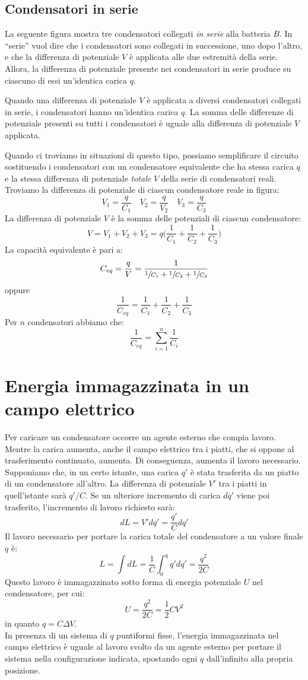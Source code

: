 \documentclass[12pt]{report}
\begin{document}
	\subsection{Condensatori in serie}
	La seguente figura mostra tre condensatori collegati \textit{in serie} alla batteria $B$. In ``serie'' vuol dire che i condensatori sono collegati in successione, uno dopo l'altro, e che la differenza di potenziale $V$ è applicata alle due estremità della serie. Allora, la differenza di potenziale presente nei condensatori in serie produce su ciascuno di essi un'identica carica $q$.
	\begin{center}
		Quando una differenza di potenziale $V$ è applicata a diversi condensatori collegati in serie, i condensatori hanno un'identica carica $q$. La somma delle differenze di potenziale presenti su tutti i condensatori è uguale alla differenza di potenziale $V$ applicata.
	\end{center}
	Quando ci troviamo in situazioni di questo tipo, possiamo semplificare il circuito sostituendo i condensatori con un condensatore equivalente che ha stessa carica $q$ e la stessa differenza di potenziale \textit{totale} $V$ della serie di condensatori reali. \\
	Troviamo la differenza di potenziale di ciascun condensatore reale in figura:
	\[
	V_1 = \frac{q}{C_1} \quad V_2 = \frac{q}{V_2} \quad V_3 = \frac{q}{C_3}
	\]
	La differenza di potenziale $V$ è la somma delle potenziali di ciascun condensatore:
	\[
	V = V_1 + V_2 + V_3 = q\Bigg(\frac{1}{C_1} + \frac{1}{C_2} + \frac{1}{C_3}\Bigg)
	\]
	La capacità equivalente è pari a:
	\[
	C_{eq} = \frac{q}{V} = \frac{1}{\sfrac{1}{C_1} + \sfrac{1}{C_2} + \sfrac{1}{C_3}}
	\]
	oppure
	\[
	\frac{1}{C_{eq}} = \frac{1}{C_1} + \frac{1}{C_2} + \frac{1}{C_3}
	\]
	Per $n$ condensatori abbiamo che:
	\[
	\frac{1}{C_{eq}} = \sum_{i=1}^{n}\frac{1}{C_i}
	\]
	\section{Energia immagazzinata in un campo elettrico}
	Per caricare un condensatore occorre un agente esterno che compia lavoro. Mentre la carica aumenta, anche il campo elettrico tra i piatti, che si oppone al trasferimento continuato, aumenta. Di conseguenza, aumenta il lavoro necessario. \\
	Supponiamo che, in un certo istante, una carica $q'$ è stata trasferita da un piatto di un condensatore all'altro. La differenza di potenziale $V'$ tra i piatti in quell'istante sarà $q'/C$. Se un ulteriore incremento di carica $dq'$ viene poi trasferito, l'incremento di lavoro richiesto sarà:
	\[
	dL = V'dq'=\frac{q'}{C}dq'
	\]
	Il lavoro necessario per portare la carica totale del condensatore a un valore finale $q$ è:
	\[
	L = \int dL = \frac{1}{C}\int_{0}^{q}q'dq' = \frac{q^2}{2C}
	\]
	Questo lavoro è immagazzinato sotto forma di energia potenziale $U$ nel condensatore, per cui:
	\[
	U = \frac{q^2}{2C} = \frac{1}{2}CV^2
	\]
	in quanto $q = C\Delta V$. \\
	In presenza di un sistema di $q$ puntiformi fisse, l'energia immagazzinata nel campo elettrico è uguale al lavoro svolto da un agente esterno per portare il sistema nella configurazione indicata, spostando ogni $q$ dall'infinito alla propria posizione.
\end{document}
